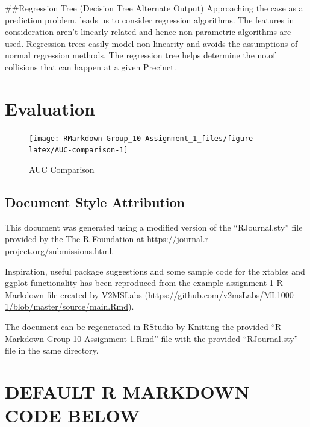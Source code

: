 \#\#Regression Tree (Decision Tree Alternate Output) Approaching the
case as a prediction problem, leads us to consider regression
algorithms. The features in consideration aren't linearly related and
hence non parametric algorithms are used. Regression trees easily model
non linearity and avoids the assumptions of normal regression methods.
The regression tree helps determine the no.of collisions that can happen
at a given Precinct.

\hypertarget{evaluation}{%
\section{Evaluation}\label{evaluation}}

\begin{Schunk}
\begin{figure}

{\centering \texttt{[image: RMarkdown-Group\_10-Assignment\_1\_files/figure-latex/AUC-comparison-1]} 

}

\caption[AUC Comparison]{AUC Comparison}\label{fig:AUC-comparison}
\end{figure}
\end{Schunk}

\hypertarget{document-style-attribution}{%
\subsection{Document Style
Attribution}\label{document-style-attribution}}

This document was generated using a modified version of the
``RJournal.sty'' file provided by the The R Foundation at
\url{https://journal.r-project.org/submissions.html}.

Inspiration, useful package suggestions and some sample code for the
xtables and ggplot functionality has been reproduced from the example
assignment 1 R Markdown file created by V2MSLabs
(\url{https://github.com/v2msLabs/ML1000-1/blob/master/source/main.Rmd}).

The document can be regenerated in RStudio by Knitting the provided ``R
Markdown-Group 10-Assignment 1.Rmd'' file with the provided
``RJournal.sty'' file in the same directory.

\hypertarget{default-r-markdown-code-below}{%
\section{DEFAULT R MARKDOWN CODE
BELOW}\label{default-r-markdown-code-below}}

